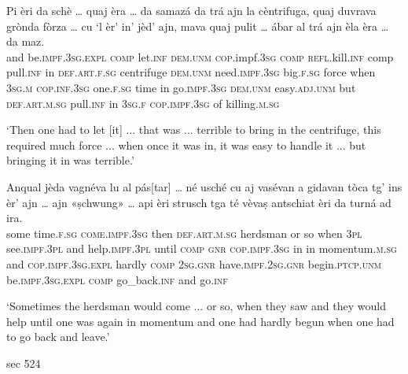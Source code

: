 \begin{linenumbers}
	\gll Pi èri da schè … quaj èra … da samazá da trá ajn la cèntrifuga, quaj duvrava grònda fòrza … cu `l èr’ in' jèd’ ajn\footnotemark, mava quaj pulit … ábar al trá ajn èla èra … da maz.   \\
	and be.\textsc{impf.3sg.expl} \textsc{comp} let.\textsc{inf} {} \textsc{dem.unm} \textsc{cop}.impf.\textsc{3sg} {} \textsc{comp} \textsc{refl}.kill.\textsc{inf} comp pull.\textsc{inf} in \textsc{def.art.f.sg} centrifuge \textsc{dem.unm} need.\textsc{impf.3sg} big.\textsc{f.sg} force {} when \textsc{3sg.m} \textsc{cop.inf.3sg} one.\textsc{f.sg} time in go.\textsc{impf.3sg} \textsc{dem.unm} easy.\textsc{adj.unm} {} but \textsc{def.art.m.sg} pull.\textsc{inf} in \textsc{3sg.f} \textsc{cop.impf.3sg} {} of killing.\textsc{m.sg}\\
\end{linenumbers}
\medskip
\glt `Then one had to let [it] ... that was ... terrible to bring in the centrifuge, this required much force ... when once it was in, it was easy to handle it ... but bringing it in was terrible.'
\medskip

\begin{linenumbers}
	\gll  Anqual jèda vagnéva lu al pás[tar] … né usché cu aj vasévan a gidavan tòca tg’ ins èr’ ajn … ajn «ṣchwung»\footnotemark{} …  api èri strusch tga té vèvaṣ antschiat èri da turná ad ira.\\
	some time.\textsc{f.sg} \textsc{come.impf.3sg} then \textsc{def.art.m.sg} herdsman {} or so when \textsc{3pl} see.\textsc{impf.3pl} and help.\textsc{impf.3pl} until \textsc{comp} \textsc{gnr} \textsc{cop.impf.3sg} in {} in momentum.\textsc{m.sg} {} and \textsc{cop.impf.3sg.expl} hardly \textsc{comp} \textsc{2sg.gnr} have.\textsc{impf.2sg.gnr} begin.\textsc{ptcp.unm} be.\textsc{impf.3sg.expl} \textsc{comp} go\_back.\textsc{inf} and go.\textsc{inf} \\
\end{linenumbers}
\medskip
\glt `Sometimes the herdsman would come ... or so, when they saw and they would help until one was again in momentum and one had hardly begun when one had to go back and leave.'
\medskip

sec 524

